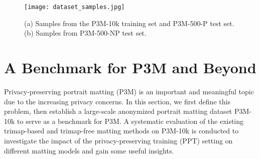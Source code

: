 \documentclass[sigconf]{acmart}
\begin{document}
\begin{table*}[htb]
\begin{center}
\end{center}
\caption{Results of trimap-free methods on P3M-500-P. Please refer to Table~\ref{tab:benchmark_trimap_based_dl} for the meaning of different symbols.}
\label{tab:benchmark_e2e}
\end{table*}

\begin{figure}
    \centering
    \texttt{[image: dataset\_samples.jpg]}
    \caption{(a) Samples from the P3M-10k training set and P3M-500-P test set. (b) Samples from P3M-500-NP test set.}
    \label{fig:data_p3m-10k}
\end{figure}
\section{A Benchmark for P3M and Beyond}
Privacy-preserving portrait matting (P3M) is an important and meaningful topic due to the increasing privacy concerns. In this section, we first define this problem, then establish a large-scale anonymized portrait matting dataset P3M-10k to serve as a benchmark for P3M. A systematic evaluation of the existing trimap-based and trimap-free matting methods on P3M-10k is conducted to investigate the impact of the privacy-preserving training (PPT) setting on different matting models and gain some useful insights.
\end{document}
